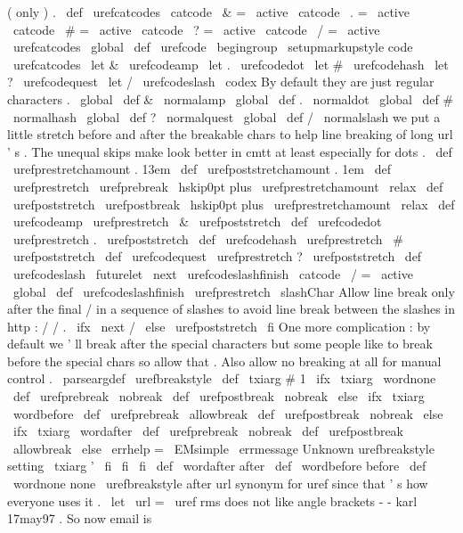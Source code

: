{{{(
only
)
.
\
def
\
urefcatcodes
{
%
\
catcode
\
&
=
\
active
\
catcode
\
.
=
\
active
\
catcode
\
#
=
\
active
\
catcode
\
?
=
\
active
\
catcode
\
/
=
\
active
}
{
\
urefcatcodes
%
\
global
\
def
\
urefcode
{
\
begingroup
\
setupmarkupstyle
{
code
}
%
\
urefcatcodes
\
let
&
\
urefcodeamp
\
let
.
\
urefcodedot
\
let
#
\
urefcodehash
\
let
?
\
urefcodequest
\
let
/
\
urefcodeslash
\
codex
}
%
%
By
default
they
are
just
regular
characters
.
\
global
\
def
&
{
\
normalamp
}
\
global
\
def
.
{
\
normaldot
}
\
global
\
def
#
{
\
normalhash
}
\
global
\
def
?
{
\
normalquest
}
\
global
\
def
/
{
\
normalslash
}
}
%
we
put
a
little
stretch
before
and
after
the
breakable
chars
to
help
%
line
breaking
of
long
url
'
s
.
The
unequal
skips
make
look
better
in
%
cmtt
at
least
especially
for
dots
.
\
def
\
urefprestretchamount
{
.
13em
}
\
def
\
urefpoststretchamount
{
.
1em
}
\
def
\
urefprestretch
{
\
urefprebreak
\
hskip0pt
plus
\
urefprestretchamount
\
relax
}
\
def
\
urefpoststretch
{
\
urefpostbreak
\
hskip0pt
plus
\
urefprestretchamount
\
relax
}
%
\
def
\
urefcodeamp
{
\
urefprestretch
\
&
\
urefpoststretch
}
\
def
\
urefcodedot
{
\
urefprestretch
.
\
urefpoststretch
}
\
def
\
urefcodehash
{
\
urefprestretch
\
#
\
urefpoststretch
}
\
def
\
urefcodequest
{
\
urefprestretch
?
\
urefpoststretch
}
\
def
\
urefcodeslash
{
\
futurelet
\
next
\
urefcodeslashfinish
}
{
\
catcode
\
/
=
\
active
\
global
\
def
\
urefcodeslashfinish
{
%
\
urefprestretch
\
slashChar
%
Allow
line
break
only
after
the
final
/
in
a
sequence
of
%
slashes
to
avoid
line
break
between
the
slashes
in
http
:
/
/
.
\
ifx
\
next
/
\
else
\
urefpoststretch
\
fi
}
}
%
One
more
complication
:
by
default
we
'
ll
break
after
the
special
%
characters
but
some
people
like
to
break
before
the
special
chars
so
%
allow
that
.
Also
allow
no
breaking
at
all
for
manual
control
.
%
\
parseargdef
\
urefbreakstyle
{
%
\
def
\
txiarg
{
#
1
}
%
\
ifx
\
txiarg
\
wordnone
\
def
\
urefprebreak
{
\
nobreak
}
\
def
\
urefpostbreak
{
\
nobreak
}
\
else
\
ifx
\
txiarg
\
wordbefore
\
def
\
urefprebreak
{
\
allowbreak
}
\
def
\
urefpostbreak
{
\
nobreak
}
\
else
\
ifx
\
txiarg
\
wordafter
\
def
\
urefprebreak
{
\
nobreak
}
\
def
\
urefpostbreak
{
\
allowbreak
}
\
else
\
errhelp
=
\
EMsimple
\
errmessage
{
Unknown
urefbreakstyle
setting
\
txiarg
'
}
%
\
fi
\
fi
\
fi
}
\
def
\
wordafter
{
after
}
\
def
\
wordbefore
{
before
}
\
def
\
wordnone
{
none
}
\
urefbreakstyle
after
%
url
synonym
for
uref
since
that
'
s
how
everyone
uses
it
.
%
\
let
\
url
=
\
uref
%
rms
does
not
like
angle
brackets
-
-
karl
17may97
.
%
So
now
email
is
}}}
